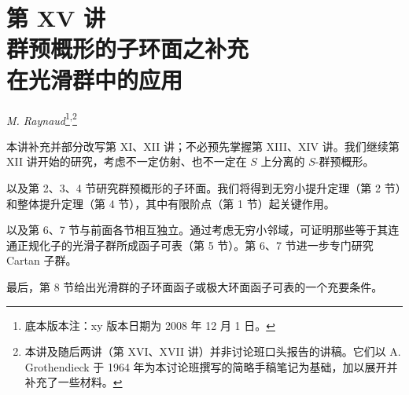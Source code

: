 \chapter*{第 XV 讲\\群预概形的子环面之补充\\在光滑群中的应用}

\begin{center}
\textit{M. Raynaud}\footnote{底本版本注：xy 版本日期为 2008 年 12 月 1 日。}\textsuperscript{,}\footnote{本讲及随后两讲（第 XVI、XVII 讲）并非讨论班口头报告的讲稿。它们以 A. Grothendieck 于 1964 年为本讨论班撰写的简略手稿笔记为基础，加以展开并补充了一些材料。}
\end{center}


本讲补充并部分改写第 XI、XII 讲；不必预先掌握第 XIII、XIV 讲。我们继续第 XII 讲开始的研究，考虑不一定仿射、也不一定在 \(S\) 上分离的 \(S\)-群预概形。

以及第 2、3、4 节研究群预概形的子环面。我们将得到无穷小提升定理（第 2 节）和整体提升定理（第 4 节），其中有限阶点（第 1 节）起关键作用。

以及第 6、7 节与前面各节相互独立。通过考虑无穷小邻域，可证明那些等于其连通正规化子的光滑子群所成函子可表（第 5 节）。第 6、7 节进一步专门研究 Cartan 子群。

最后，第 8 节给出光滑群的子环面函子或极大环面函子可表的一个充要条件。




